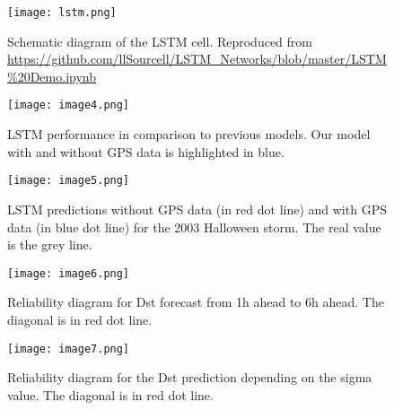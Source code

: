 
\begin{figure}
	\noindent\texttt{[image: lstm.png]}
	\caption{Schematic diagram of the LSTM cell. Reproduced from \url{https://github.com/llSourcell/LSTM_Networks/blob/master/LSTM\%20Demo.ipynb}}
	\label{fig:lstmcell}
\end{figure}






\begin{figure}
	\texttt{[image: image4.png]}
	\caption{LSTM performance in comparison to previous models. Our model with and without GPS data is highlighted in blue.}
	\label{fig:lstmperf}
\end{figure}






\begin{figure}
	\texttt{[image: image5.png]}
	\caption{LSTM predictions without GPS data (in red dot line) and with GPS data (in blue dot line) for the 2003 Halloween storm. The real value is the grey line.}
	\label{fig:lstmpredswoGPS}
\end{figure}





\begin{figure}
	\texttt{[image: image6.png]}
	\caption{Reliability diagram for Dst forecast from 1h ahead to 6h ahead. The diagonal is in red dot line.}
	\label{fig:gpnnreliability}
\end{figure}






\begin{figure}
	\texttt{[image: image7.png]}
	\caption{Reliability diagram for the Dst prediction depending on the sigma value. The diagonal is in red dot line.}
	\label{fig:gpnnreliabilitysigma}	
\end{figure}


